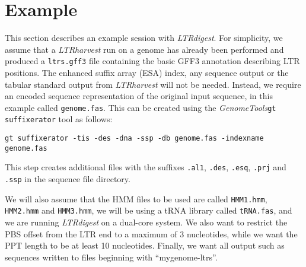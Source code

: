 \documentclass[12pt,titlepage]{article}
\newcommand{\LTRdigest}{\textit{LTRdigest}\xspace}
\newcommand{\GenomeTools}{\textit{GenomeTools}\xspace}
\newcommand{\Gtsuffixerator}{\texttt{gt suffixerator}\xspace}
\begin{document}
\begin{Justshowoptions}



\end{Justshowoptions}

\section{Example}

This section describes an example session with \LTRdigest . For simplicity, we
assume that a \emph{LTRharvest} run on a genome has already been performed and
produced a \texttt{ltrs.gff3} file containing the basic GFF3 annotation
describing LTR positions. The enhanced suffix array (ESA) index, any sequence
output or the tabular standard output from \emph{LTRharvest} will not be needed.
Instead, we require an encoded sequence representation of the original input
sequence, in this example called \texttt{genome.fas}. This can be created using
the \GenomeTools \Gtsuffixerator tool as follows:

\texttt{gt suffixerator -tis -des -dna -ssp -db genome.fas -indexname
genome.fas}

This step creates additional files with the suffixes \texttt{.al1},
\texttt{.des}, \texttt{.esq}, \texttt{.prj} and \texttt{.ssp} in the sequence
file directory.

We will also assume that the HMM files to be used are called \texttt{HMM1.hmm},
\texttt{HMM2.hmm} and \texttt{HMM3.hmm}, we will be using a tRNA library called
\texttt{tRNA.fas}, and we are running \LTRdigest on a dual-core system. We also
want to restrict the PBS offset from the LTR end to a maximum of 3 nucleotides,
while we want the PPT length to be at least 10 nucleotides. Finally, we want all
output such as sequences written to files beginning with ``mygenome-ltrs''.
\end{document}
